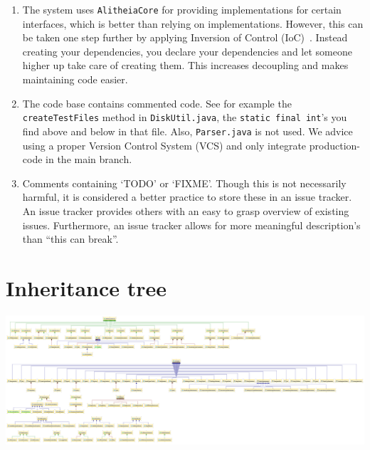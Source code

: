 \documentclass{article}
\begin{document}
\begin{enumerate}
\item The system uses \verb|AlitheiaCore| for providing implementations for certain interfaces, which is better than relying on implementations. However, this can be taken one step further by applying Inversion of Control (IoC)~\cite{ioc}. Instead creating your dependencies, you declare your dependencies and let someone higher up take care of creating them. This increases decoupling and makes maintaining code easier.

\item The code base contains commented code. See for example the \verb|createTestFiles| method in \verb|DiskUtil.java|, the \verb|static final int|'s you find above and below in that file. Also, \verb|Parser.java| is not used. We advice using a proper Version Control System (VCS) and only integrate production-code in the main branch.

\item Comments containing `TODO' or `FIXME'. Though this is not necessarily harmful, it is considered a better practice to store these in an issue tracker. An issue tracker provides others with an easy to grasp overview of existing issues. Furthermore, an issue tracker allows for more meaningful description's than ``this can break''.
\end{enumerate}




\newpage
\appendix
\section{Inheritance tree} \label{app:inheritance}

\begin{sideways}
	\includegraphics[width=1.3\textwidth]{inheritance-diagram}
	\label{fig:inheritance}
\end{sideways}
\end{document}

